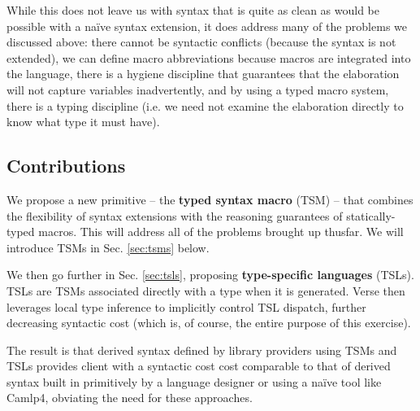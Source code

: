 While this does not leave us with syntax that is quite as clean as would be possible with a  na\"ive syntax extension,  it does address many of the problems we discussed above: there cannot be syntactic conflicts (because the syntax is not extended), we can define macro abbreviations because macros are integrated into the language, there is a hygiene discipline that guarantees that the elaboration will not capture variables inadvertently, and by using a typed macro system, there is a typing discipline (i.e. we need not examine the elaboration directly to know what type it must have). 


\subsection{Contributions}\label{sec:syntax-contributions}
We propose a new primitive -- the \textbf{typed syntax macro} (TSM) -- that combines the flexibility of syntax extensions with the reasoning guarantees of statically-typed macros. This will address all of the problems brought up thusfar. We will introduce TSMs in Sec. \ref{sec:tsms} below.

We then go further in Sec. \ref{sec:tsls}, proposing \textbf{type-specific languages} (TSLs). TSLs are TSMs associated directly with a type when it is generated. Verse then leverages local type inference to implicitly control TSL dispatch, further decreasing syntactic cost (which is, of course, the entire purpose of this exercise). 

The result is that derived syntax defined by library providers using TSMs and TSLs provides client with a syntactic cost cost comparable to that of derived syntax built in primitively by a language designer or  using a na\"ive tool like Camlp4, obviating the need for these approaches.

